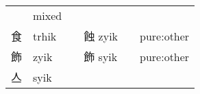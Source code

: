 \documentclass[14pt,a4paper]{scrartcl}
\begin{document}
\begin{longtable}[c]{@{}llllll@{}}
\begin{minipage}[t]{0.14\columnwidth}
\strut\end{minipage} &
\begin{minipage}[t]{0.14\columnwidth}\raggedright\strut
mixed
\strut\end{minipage}\tabularnewline
\begin{minipage}[t]{0.14\columnwidth}\raggedright\strut
食
\strut\end{minipage} &
\begin{minipage}[t]{0.14\columnwidth}\raggedright\strut
trhik
\strut\end{minipage} &
\begin{minipage}[t]{0.14\columnwidth}\raggedright\strut
\strut\end{minipage} &
\begin{minipage}[t]{0.14\columnwidth}\raggedright\strut
蝕 zyik
\strut\end{minipage} &
\begin{minipage}[t]{0.14\columnwidth}\raggedright\strut
\strut\end{minipage} &
\begin{minipage}[t]{0.14\columnwidth}\raggedright\strut
pure:other
\strut\end{minipage}\tabularnewline
\begin{minipage}[t]{0.14\columnwidth}\raggedright\strut
飾
\strut\end{minipage} &
\begin{minipage}[t]{0.14\columnwidth}\raggedright\strut
zyik
\strut\end{minipage} &
\begin{minipage}[t]{0.14\columnwidth}\raggedright\strut
\strut\end{minipage} &
\begin{minipage}[t]{0.14\columnwidth}\raggedright\strut
飾 syik
\strut\end{minipage} &
\begin{minipage}[t]{0.14\columnwidth}\raggedright\strut
\strut\end{minipage} &
\begin{minipage}[t]{0.14\columnwidth}\raggedright\strut
pure:other
\strut\end{minipage}\tabularnewline
\begin{minipage}[t]{0.14\columnwidth}\raggedright\strut
亼
\strut\end{minipage} &
\begin{minipage}[t]{0.14\columnwidth}\raggedright\strut
syik
\strut\end{minipage} &
\begin{minipage}[t]{0.14\columnwidth}\raggedright\strut

\end{minipage}
\end{longtable}
\end{document}
